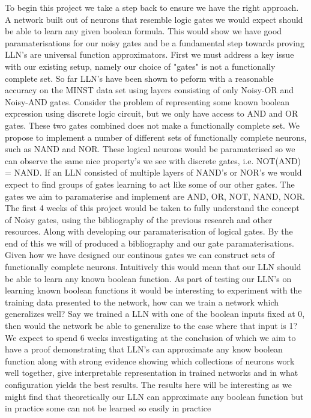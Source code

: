 \documentclass[11pt, a4paper, twoside, openright]{report}
\begin{document}
To begin this project we take a step back to ensure we have the right approach. A network built out of neurons that resemble logic gates we would expect should be able to learn any given boolean formula. This would show we have good paramaterisations for our noisy gates and be a fundamental step towards proving LLN's are universal function approximators. First we must address a key issue with our existing setup, namely our choice of "gates" is not a functionally complete set. So far LLN's have been shown to peform with a reasonable accuracy on the MINST data set using layers consisting of only Noisy-OR and Noisy-AND gates. Consider the problem of representing some known boolean expression using discrete logic circuit, but we only have access to AND and OR gates. These two gates combined does not make a functionally complete set. We propose to implement a number of different sets of functionally complete neurons, such as NAND and NOR. These logical neurons would be paramaterised so we can observe the same nice property's we see with discrete gates, i.e. NOT(AND) = NAND. If an LLN consisted of multiple layers of NAND's or NOR's we would expect to find groups of gates learning to act like some of our other gates. The gates we aim to paramaterise and implement are AND, OR, NOT, NAND, NOR. \\

The first 4 weeks of this project would be taken to fully understand the concept of Noisy gates, using the bibliography of the previous research and other resources. Along with developing our paramaterisation of logical gates. By the end of this we will of produced a bibliography and our gate paramaterisations.\\

Given how we have designed our continous gates we can construct sets of functionally complete neurons. Intuitively this would mean that our LLN should be able to learn any known boolean function. As part of testing our LLN's on learning known boolean functions it would be interesting to experiment with the training data presented to the network, how can we train a network which generalizes well? Say we trained a LLN with one of the boolean inputs fixed at 0, then would the network be able to generalize to the case where that input is 1? We expect to spend 6 weeks investigating at the conclusion of which we aim to have a proof demonstrating that LLN's can approximate any know boolean function along with strong evidence showing which collections of neurons work well together, give interpretable representation in trained networks and in what configuration yields the best results. The results here will be interesting as we might find that theoretically our LLN can approximate any boolean function but in practice some can not be learned so easily in practice\\
\end{document}
